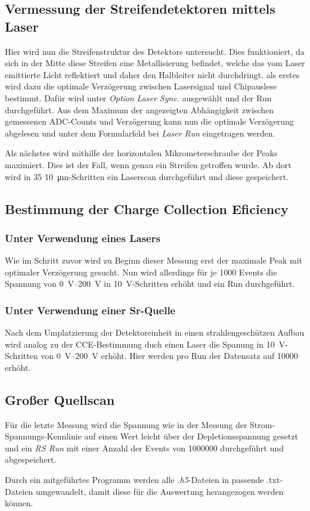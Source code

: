 \FloatBarrier
\subsection{Vermessung der Streifendetektoren mittels Laser}
\label{sec:Vermessung_Laser}
Hier wird nun die Streifenstruktur des Detektors untersucht. Dies funktioniert,
da sich in der Mitte diese Streifen eine Metallisierung befindet, welche das vom
Laser emittierte Licht reflektiert und daher den Halbleiter nicht durchdringt.
als erstes wird dazu die optimale Verzögerung zwischen Lasersignal und Chipauslese
bestimmt. Dafür wird unter \textit{Option} \textit{Laser Sync.} ausgewählt und
der Run durchgeführt. Aus dem Maximum der angezeigten Abhängigkeit zwischen
gemessenen ADC-Counts und Verzögerung kann nun die optimale Verzögerung abgelesen
und unter dem Formularfeld bei \textit{Laser Run} eingetragen werden.

Als nächstes wird mithilfe der horizontalen Mikrometerschraube der Peaks maximiert.
Dies ist der Fall, wenn genau ein Streifen getroffen wurde. Ab dort wird in \num{35}
\SI{10}{\micro\meter}-Schritten ein Laserscan durchgeführt und diese gespeichert.


\subsection{Bestimmung der Charge Collection Eficiency}
\label{sec:CCE}
\subsubsection{Unter Verwendung eines Lasers}
Wie im Schritt zuvor wird zu Beginn dieser Messung erst der maximale Peak mit
optimaler Verzögerung gesucht. Nun wird allerdings für je \num{1000} Events die
Spannung von \SIrange{0}{200}{\volt} in \SI{10}{\volt}-Schritten erhöht und ein
Run durchgeführt.

\subsubsection{Unter Verwendung einer Sr-Quelle}
Nach dem Umplatzierung der Detektoreinheit in einen strahlengeschützen Aufbau wird
analog zu der CCE-Bestimmung duch einen Laser die Spanung in \SI{10}{\volt}-Schritten
von \SIrange{0}{200}{\volt} erhöht. Hier werden pro Run der Datensatz auf \num{10000}
erhöht.

\subsection{Großer Quellscan}
\label{sec:Quellscan}
Für die letzte Messung wird die Spannung wie in der Messung der Strom-Spannungs-Kennlinie
auf einen Wert leicht über der Depletionsspannung gesetzt und ein \textit{RS Run} mit
einer Anzahl der Events von \num{1000000} durchgeführt und abgespeichert.

Durch ein mitgeführtes Programm werden alle \textit{.h5}-Dateien in passende .txt-Dateien
umgewandelt, damit diese für die Auswertung herangezogen werden können.
